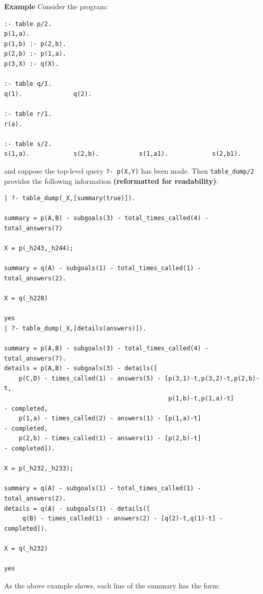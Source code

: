 \begin{description}
{\bf Example}  Consider the program:
\begin{verbatim}
:- table p/2.
p(1,a).
p(1,b) :- p(2,b).
p(2,b) :- p(1,a).
p(3,X) :- q(X).

:- table q/1.
q(1).              q(2).

:- table r/1.
r(a).

:- table s/2.
s(1,a).            s(2,b).           s(1,a1).            s(2,b1).
\end{verbatim}
and suppose the top-level query {\tt ?- p(X,Y)} has been made.  Then
{\tt table\_dump/2} provides the following information {\bf
 (reformatted for readability)}:
%
{\small
\begin{verbatim}
| ?- table_dump(_X,[summary(true)]).

summary = p(A,B) - subgoals(3) - total_times_called(4) - total_answers(7)

X = p(_h243,_h244);

summary = q(A) - subgoals(1) - total_times_called(1) - total_answers(2).

X = q(_h228)

yes
| ?- table_dump(_X,[details(answers)]).

summary = p(A,B) - subgoals(3) - total_times_called(4) - total_answers(7).
details = p(A,B) - subgoals(3) - details([
    p(C,D) - times_called(1) - answers(5) - [p(3,1)-t,p(3,2)-t,p(2,b)-t,
                                             p(1,b)-t,p(1,a)-t]          - completed,
    p(1,a) - times_called(2) - answers(1) - [p(1,a)-t]                   - completed,
    p(2,b) - times_called(1) - answers(1) - [p(2,b)-t]                   - completed]).

X = p(_h232,_h233);

summary = q(A) - subgoals(1) - total_times_called(1) - total_answers(2).
details = q(A) - subgoals(1) - details([
     q(B) - times_called(1) - answers(2) - [q(2)-t,q(1)-t] - completed]).

X = q(_h232)

yes
\end{verbatim}
}

As the above example shows, each line of the summary has the form:


\end{description}
